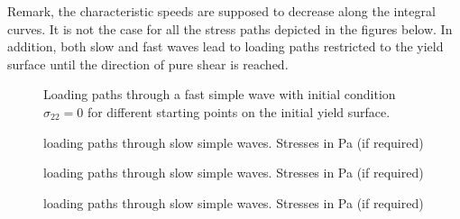Remark, the characteristic speeds are supposed to decrease along the integral curves. It is not the case for all the stress paths depicted in the figures below. In addition, both slow and fast waves lead to loading paths restricted to the yield surface until the direction of pure shear is reached.
\begin{figure}[h!]
  \centering
  \caption{Loading paths through a fast simple wave with initial condition $\sigma_{22}=0$ for different starting points on the initial yield surface.}
  \label{fig:fast_path_plane_strains}
\end{figure}


\begin{figure}[h!]
  \centering
  \caption{loading paths through slow simple waves. Stresses in Pa (if required)}
  \label{fig:slow_path_plane_strains}
\end{figure}

\begin{figure}[h!]
  \centering
  \caption{loading paths through slow simple waves. Stresses in Pa (if required)}
  \label{fig:slow_path_plane_strains}
\end{figure}


\begin{figure}[h!]
  \centering
  \caption{loading paths through slow simple waves. Stresses in Pa (if required)}
  \label{fig:slow_path_plane_strains}
\end{figure}






